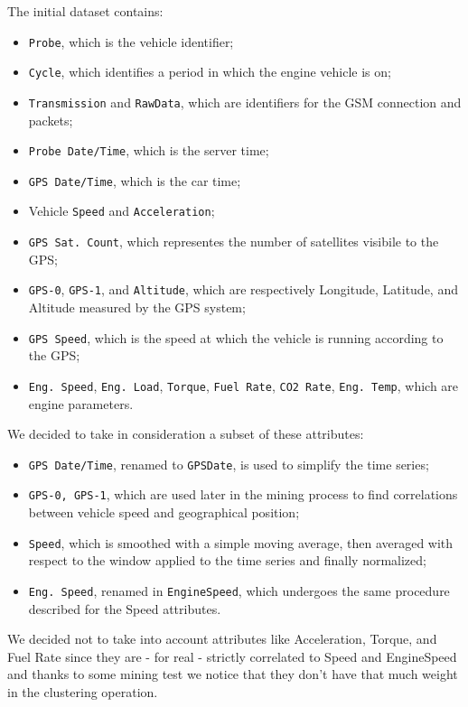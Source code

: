 The initial dataset contains:
\begin{itemize}
\item \texttt{Probe}, which is the vehicle identifier;
\item \texttt{Cycle}, which identifies a period in which the engine vehicle is on;
\item \texttt{Transmission} and \texttt{RawData}, which are identifiers for the GSM connection and packets;
\item \texttt{Probe Date/Time}, which is the server time;
\item \texttt{GPS Date/Time}, which is the car time;
\item Vehicle \texttt{Speed} and \texttt{Acceleration};
\item \texttt{GPS Sat. Count}, which representes the number of satellites visibile to the GPS;
\item \texttt{GPS-0}, \texttt{GPS-1}, and \texttt{Altitude}, which are respectively Longitude, Latitude, and Altitude measured by the GPS system;
\item \texttt{GPS Speed}, which is the speed at which the vehicle is running according to the GPS;
\item \texttt{Eng. Speed}, \texttt{Eng. Load}, \texttt{Torque}, \texttt{Fuel Rate}, \texttt{CO2 Rate}, \texttt{Eng. Temp}, which are engine parameters.
\end{itemize}
We decided to take in consideration a subset of these attributes:
\begin{itemize}
\item \texttt{GPS Date/Time}, renamed to \texttt{GPSDate}, is used to simplify the time series;
\item \texttt{GPS-0, GPS-1}, which are used later in the mining process to find correlations between vehicle speed and geographical position;
\item \texttt{Speed}, which is smoothed with a simple moving average, then averaged with respect to the window applied to the time series and finally normalized;
\item \texttt{Eng. Speed}, renamed in \texttt{EngineSpeed}, which undergoes the same procedure described for the Speed attributes.
\end{itemize}
We decided not to take into account attributes like Acceleration, Torque, and Fuel Rate since they are - for real - strictly correlated to Speed and EngineSpeed and thanks to some mining test we notice that they don't have that much weight in the clustering operation.

